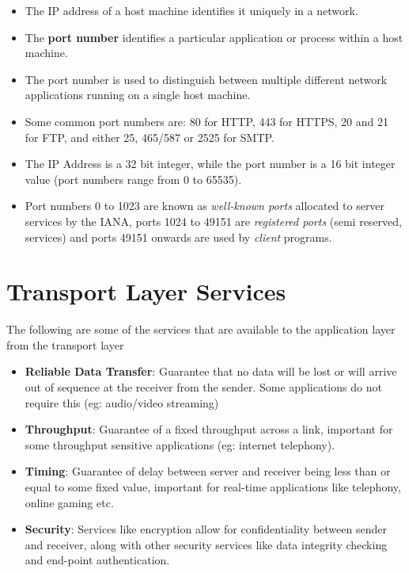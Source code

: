 \documentclass{article}
\theoremstyle{plain}
\theoremstyle{definition}
\begin{document}
\begin{itemize}
    \item The IP address of a host machine identifies it uniquely in a network. 
    
    \item The \textbf{port number} identifies a particular application or process within a host machine. 
    
    \item The port number is used to distinguish between multiple different network applications running on a single host machine. 
    
    \item Some common port numbers are: 80 for HTTP, 443 for HTTPS, 20 and 21 for FTP, and either 25, 465/587 or 2525 for SMTP.
    
    \item The IP Address is a 32 bit integer, while the port number is a 16 bit integer value (port numbers range from 0 to 65535).
    
    \item Port numbers 0 to 1023 are known as \textit{well-known ports} allocated to server services by the IANA, ports 1024 to 49151 are \textit{registered ports} (semi reserved, services) and ports 49151 onwards are used by \textit{client} programs. 
\end{itemize}

\section{Transport Layer Services}
The following are some of the services that are available to the application layer from the transport layer
\begin{itemize}
    \item \textbf{Reliable Data Transfer}: Guarantee that no data will be lost or will arrive out of sequence at the receiver from the sender. Some applications do not require this (eg: audio/video streaming)
    
    \item \textbf{Throughput}: Guarantee of a fixed throughput across a link, important for some throughput sensitive applications (eg: internet telephony).
    
    \item \textbf{Timing}: Guarantee of delay between server and receiver being less than or equal to some fixed value, important for real-time applications like telephony, online gaming etc.
    
    \item \textbf{Security}: Services like encryption allow for confidentiality between sender and receiver, along with other security services like data integrity checking and end-point authentication.
\end{itemize}
\end{document}
